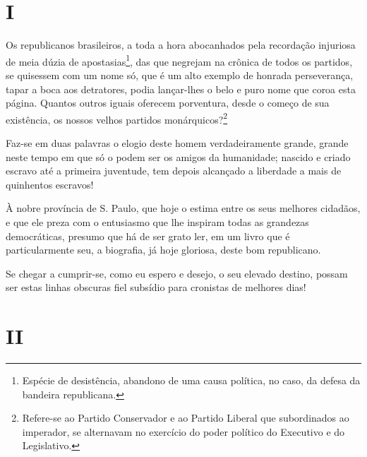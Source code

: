 \section*{I}

Os republicanos brasileiros, a toda a hora abocanhados pela recordação
injuriosa de meia dúzia de apostasias\footnote{Espécie de desistência,
  abandono de uma causa política, no caso, da defesa da bandeira
  republicana.}, das que negrejam na crônica de todos os partidos, se
quisessem com um nome só, que é um alto exemplo de honrada perseverança,
tapar a boca aos detratores, podia lançar-lhes o belo e puro nome que
coroa esta página. Quantos outros iguais oferecem porventura, desde o
começo de sua existência, os nossos velhos partidos
monárquicos?\footnote{Refere-se ao Partido Conservador e ao Partido
  Liberal que subordinados ao imperador, se alternavam no exercício do
  poder político do Executivo e do Legislativo.}

Faz-se em duas palavras o elogio deste homem verdadeiramente grande,
grande neste tempo em que só o podem ser os amigos da humanidade;
nascido e criado escravo até a primeira juventude, tem depois alcançado
a liberdade a mais de quinhentos escravos!

À nobre província de S. Paulo, que hoje o estima entre os seus melhores
cidadãos, e que ele preza com o entusiasmo que lhe inspiram todas as
grandezas democráticas, presumo que há de ser grato ler, em um livro que
é particularmente seu, a biografia, já hoje gloriosa, deste bom
republicano.

Se chegar a cumprir-se, como eu espero e desejo, o seu elevado destino,
possam ser estas linhas obscuras fiel subsídio para cronistas de
melhores dias!

\section*{II}

